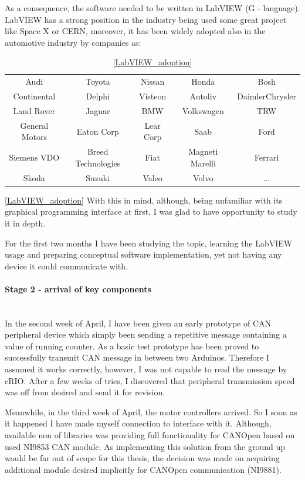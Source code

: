 As a consequence, the software needed to be written in LabVIEW (G - language). LabVIEW has a strong position in the industry being used some great project like Space X or CERN, moreover, it has been widely adopted also in the automotive industry by companies as:
\begin{table}[H]
    \centering
    \begin{tabular}{c|c|c|c|c}
        Audi & Toyota & Nissan & Honda & Bosh \\ 
        Continental & Delphi & Visteon & Autoliv & DaimlerChrysler \\
        Land Rover & Jaguar & BMW & Volkswagen & TRW \\
        General Motors & Eaton Corp & Lear Corp & Saab & Ford \\
        Siemens VDO & Breed Technologies & Fiat & Magneti Marelli & Ferrari \\
        Skoda & Suzuki & Valeo & Volvo & ...
    \end{tabular}
    \caption*{\ref{LabVIEW_adoption}}
    \label{tab:LabVIEW_adoption}
\end{table}\ref{LabVIEW_adoption}
With this in mind, although, being unfamiliar with its graphical programming interface at first, I was glad to have opportunity to study it in depth.

For the first two months I have been studying the topic, learning the LabVIEW usage and preparing conceptual software implementation, yet not having any device it could communicate with.

\paragraph{Stage 2 - arrival of key components}   
\addtocounter{section}{1}
\mbox{}\\
In the second week of April, I have been given an early prototype of CAN peripheral device which simply been sending a repetitive message containing a value of running counter. As a basic test prototype has been proved to successfully transmit CAN message in between two Arduinos. Therefore I assumed it works correctly, however, I was not capable to read the message by cRIO. After a few weeks of tries, I discovered that peripheral transmission speed was off from desired and send it for revision.

Meanwhile, in the third week of April, the motor controllers arrived. So I soon as it happened I have made myself connection to interface with it. Although, available non of libraries was providing full functionality for CANOpen based on used NI9853 CAN module. As implementing this solution from the ground up would be far out of scope for this thesis, the decision was made on acquiring additional module desired implicitly for CANOpen communication (NI9881).

